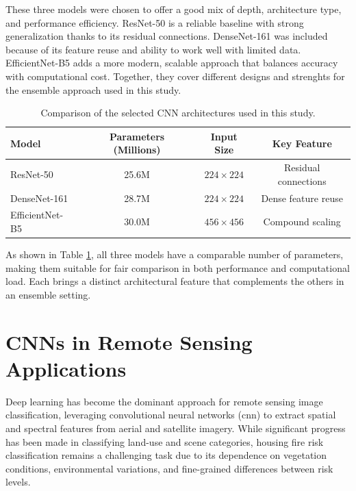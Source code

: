 These three models were chosen to offer a good mix of depth, architecture type, and performance 
efficiency. ResNet-50 is a reliable baseline with strong generalization thanks to its residual 
connections. DenseNet-161 was included because of its feature reuse and ability to work well 
with limited data. EfficientNet-B5 adds a more modern, scalable approach that balances accuracy 
with computational cost. Together, they cover different designs and strenghts for the ensemble 
approach used in this study.

\begin{table}[ht]
    \centering
    \renewcommand{\arraystretch}{1.2}
    \setlength{\tabcolsep}{10pt}
    \begin{tabular}{lccc}
        \toprule
        \textbf{Model} & \textbf{Parameters (Millions)} & \textbf{Input Size} & \textbf{Key Feature} \\
        \midrule
        ResNet-50      & 25.6M & $224 \times 224$ & Residual connections \\
        DenseNet-161   & 28.7M & $224 \times 224$ & Dense feature reuse \\
        EfficientNet-B5 & 30.0M & $456 \times 456$ & Compound scaling \\
        \bottomrule
    \end{tabular}
    \caption{Comparison of the selected CNN architectures used in this study.}
    \label{tab:model_comparison_params}
\end{table}

As shown in Table \ref{tab:model_comparison_params}, all three models have a comparable number 
of parameters, making them suitable for fair comparison in both performance and computational 
load. Each brings a distinct architectural feature that complements the others in an ensemble setting.


\section{CNNs in Remote Sensing Applications}

Deep learning has become the dominant approach for remote sensing image classification, 
leveraging convolutional neural networks (\gls{cnn}) to extract spatial and spectral features 
from aerial and satellite imagery. While significant progress has been made in classifying 
land-use and scene categories, housing fire risk classification remains a challenging task due 
to its dependence on vegetation conditions, environmental variations, and fine-grained 
differences between risk levels.

